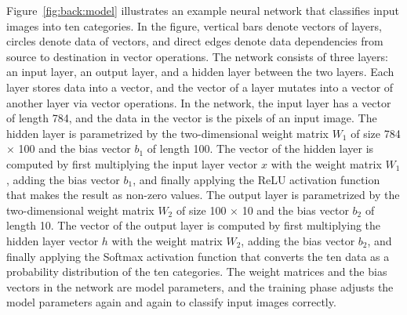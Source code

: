 Figure~\ref{fig:back:model} illustrates an example neural network that
classifies input images into ten categories.
In the figure, vertical bars denote vectors of layers, circles denote data of
vectors, and direct edges denote data dependencies from source to destination
in vector operations.
The network consists of three layers: an input layer, an output layer, and a
hidden layer between the two layers.
Each layer stores data into a vector, and the vector of a layer mutates into a
vector of another layer via vector operations.  
In the network, the input layer has a vector of length 784, and the data in the
vector is the pixels of an input image.
The hidden layer is parametrized by the two-dimensional weight matrix $W_1$ of
size 784 $\times$ 100 and the bias vector $b_1$ of length 100.
The vector of the hidden layer is computed by first multiplying the input layer
vector $x$ with the weight matrix $W_1$, adding the bias vector $b_1$, and
finally applying the ReLU activation function that makes the result as non-zero
values.
The output layer is parametrized by the two-dimensional weight matrix $W_2$ of
size 100 $\times$ 10 and the bias vector $b_2$ of length 10.
The vector of the output layer is computed by first multiplying the hidden
layer vector $h$ with the weight matrix $W_2$, adding the bias vector $b_2$,
and finally applying the Softmax activation function that converts the ten data
as a probability distribution of the ten categories.
The weight matrices and the bias vectors in the network are model parameters,
and the training phase adjusts the model parameters again and again to classify
input images correctly.


